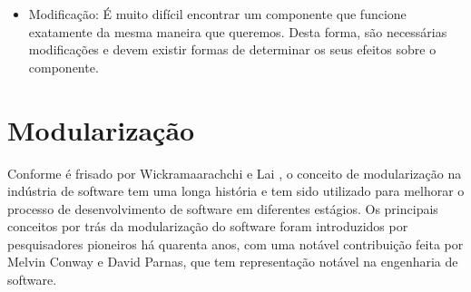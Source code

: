\begin{itemize}
\item Modificação: É muito difícil encontrar um componente que funcione
exatamente da mesma maneira que queremos. Desta forma, são necessárias modificações e devem existir formas de determinar os seus efeitos sobre o componente.


\end{itemize}




\section{Modularização}\label{sec:modularizacao} %




Conforme é frisado por Wickramaarachchi e Lai \citep{7062705}, o conceito de modularização na indústria de software tem uma longa história e tem sido utilizado para melhorar o processo de desenvolvimento de software em diferentes estágios. Os principais conceitos por trás da modularização do software foram introduzidos por pesquisadores pioneiros há quarenta anos, com uma notável contribuição feita por Melvin Conway e David Parnas, que tem representação notável na engenharia de software.


